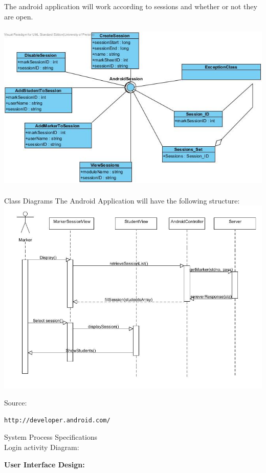 \documentclass[12pt,a4paper]{article}
\begin{document}
\noindent The android application will work according to sessions and whether or not they are open.\\\\
\includegraphics[scale=0.6]{APISession.jpg}\\\\

\pagebreak \noindent Class Diagrams
The Android Application will have the following structure:\\ 
\includegraphics[scale=0.4]{androidSpecs.jpg}

\noindent Source:
\begin{verbatim}
http://developer.android.com/
\end{verbatim}

\noindent System Process Specifications\\
Login activity Diagram:


\textbf{User Interface Design:}
\end{document}

